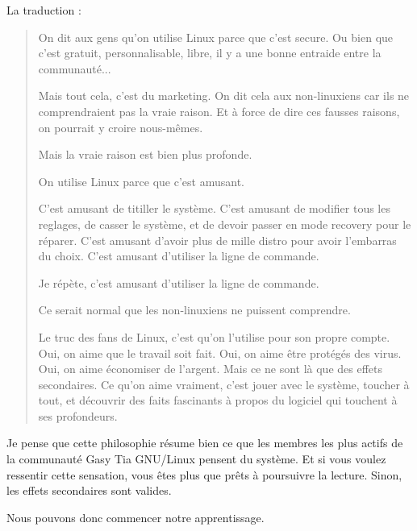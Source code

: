 La traduction :

\begin{quotation}
  On dit aux gens qu'on utilise Linux parce que c'est secure. Ou bien que c'est
  gratuit, personnalisable, libre, il y a une bonne entraide entre la communauté...

  Mais tout cela, c'est du marketing. On dit cela aux non-linuxiens car ils ne
  comprendraient pas la vraie raison. Et à force de dire ces fausses raisons, on
  pourrait y croire nous-mêmes.

  Mais la vraie raison est bien plus profonde.

  On utilise Linux parce que c'est amusant.

  C'est amusant de titiller le système. C'est amusant de modifier tous les
  reglages, de casser le système, et de devoir passer en mode recovery pour le
  réparer. C'est amusant d'avoir plus de mille distro pour avoir l'embarras du
  choix. C'est amusant d'utiliser la ligne de commande.

  Je répète, c'est amusant d'utiliser la ligne de commande.

  Ce serait normal que les non-linuxiens ne puissent comprendre.

  Le truc des fans de Linux, c'est qu'on l'utilise pour son propre compte. Oui,
  on aime que le travail soit fait. Oui, on aime être protégés des virus. Oui,
  on aime économiser de l'argent. Mais ce ne sont là que des effets secondaires.
  Ce qu'on aime vraiment, c'est jouer avec le système, toucher à tout, et
  découvrir des faits fascinants à propos du logiciel qui touchent à ses profondeurs.
\end{quotation}

Je pense que cette philosophie résume bien ce que les membres les plus actifs de
la communauté Gasy Tia GNU/Linux pensent du système. Et si vous voulez ressentir
cette sensation, vous êtes plus que prêts à poursuivre la lecture. Sinon, les
effets secondaires sont valides.

Nous pouvons donc commencer notre apprentissage.
